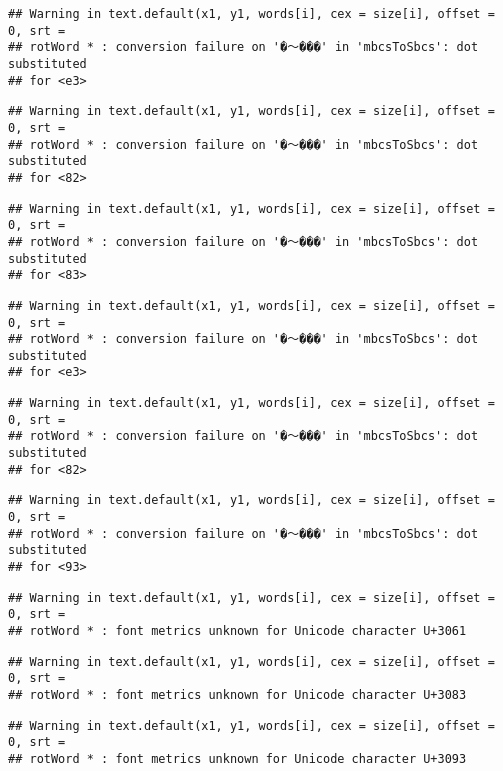\documentclass[]{article}
\begin{document}
\begin{verbatim}
## Warning in text.default(x1, y1, words[i], cex = size[i], offset = 0, srt =
## rotWord * : conversion failure on '�～���' in 'mbcsToSbcs': dot substituted
## for <e3>
\end{verbatim}

\begin{verbatim}
## Warning in text.default(x1, y1, words[i], cex = size[i], offset = 0, srt =
## rotWord * : conversion failure on '�～���' in 'mbcsToSbcs': dot substituted
## for <82>
\end{verbatim}

\begin{verbatim}
## Warning in text.default(x1, y1, words[i], cex = size[i], offset = 0, srt =
## rotWord * : conversion failure on '�～���' in 'mbcsToSbcs': dot substituted
## for <83>
\end{verbatim}

\begin{verbatim}
## Warning in text.default(x1, y1, words[i], cex = size[i], offset = 0, srt =
## rotWord * : conversion failure on '�～���' in 'mbcsToSbcs': dot substituted
## for <e3>
\end{verbatim}

\begin{verbatim}
## Warning in text.default(x1, y1, words[i], cex = size[i], offset = 0, srt =
## rotWord * : conversion failure on '�～���' in 'mbcsToSbcs': dot substituted
## for <82>
\end{verbatim}

\begin{verbatim}
## Warning in text.default(x1, y1, words[i], cex = size[i], offset = 0, srt =
## rotWord * : conversion failure on '�～���' in 'mbcsToSbcs': dot substituted
## for <93>
\end{verbatim}

\begin{verbatim}
## Warning in text.default(x1, y1, words[i], cex = size[i], offset = 0, srt =
## rotWord * : font metrics unknown for Unicode character U+3061
\end{verbatim}

\begin{verbatim}
## Warning in text.default(x1, y1, words[i], cex = size[i], offset = 0, srt =
## rotWord * : font metrics unknown for Unicode character U+3083
\end{verbatim}

\begin{verbatim}
## Warning in text.default(x1, y1, words[i], cex = size[i], offset = 0, srt =
## rotWord * : font metrics unknown for Unicode character U+3093
\end{verbatim}
\end{document}

